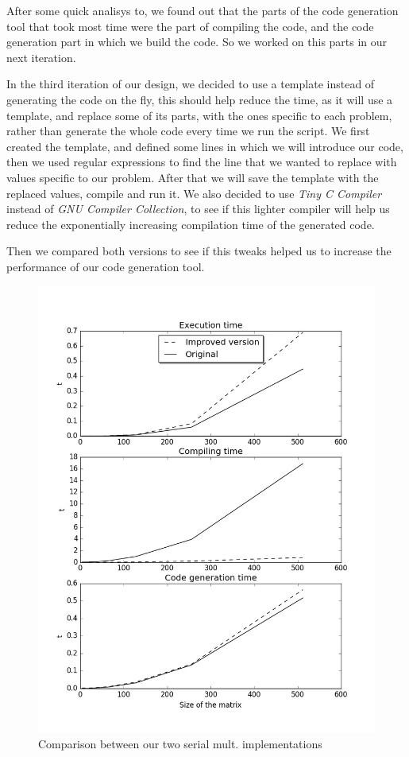 \documentclass{article}
\begin{document}
After some quick analisys to, we found out that the parts of the code generation tool that took most time were the part of compiling the code, and the code generation part in which we build the code. So we worked on this parts in our next iteration.

In the third iteration of our design, we decided to use a template instead of generating the code on the fly, this should help reduce the time, as it will use a template, and replace some of its parts, with the ones specific to each problem, rather than generate the whole code every time we run the script. We first created the template, and defined some lines in which we will introduce our code, then we used regular expressions to find the line that we wanted to replace with values specific to our problem. After that we will save the template with the replaced values, compile and run it. We also decided to use \textit{Tiny C Compiler} instead of \textit{GNU Compiler Collection}, to see if this lighter compiler will help us reduce the exponentially increasing compilation time of the generated code.

Then we compared both versions to see if this tweaks helped us to increase the performance of our code generation tool.


\begin{figure}[H]
\begin{center}
\includegraphics[scale=.2]{Plot}
\end{center}
\caption{Comparison between our two serial mult. implementations}
\end{figure}
\end{document}
